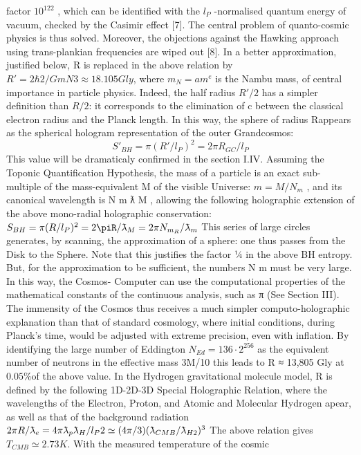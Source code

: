 factor $10^{122}$ , which can be identified with the $l_{P}$ -normalised quantum energy of vacuum, checked by
the Casimir effect [7]. The central problem of quanto-cosmic physics is thus solved. Moreover, the
objections against the Hawking approach using trans-plankian frequencies are wiped out [8].
In a better approximation, justified below, R is replaced in the above relation by $R\prime = 2\hbar 2/Gm N3
≈ 18.105 Gly$, where $m_{N} = am^{e}$ is the Nambu mass, of central importance in particle
physics. Indeed, the half radius $R\prime/2$ has a simpler definition than $R/2$: it corresponds to the
elimination of c between the classical electron radius and the Planck length. In this way, the sphere
of radius R\prime appears as the spherical hologram representation of the outer Grandcosmos:
$$S\prime_{BH} = \pi(R\prime/l_{P} )^{2} = 2\pi R_{GC} /l_{P}$$
This value will be dramaticaly confirmed in the section I.IV.
Assuming the Toponic Quantification Hypothesis, the mass of a particle is an exact sub-multiple
of the mass-equivalent M of the visible Universe: $m = M/N_{m}$ , and its canonical wavelength is N m ƛ M ,
allowing the following holographic extension of the above mono-radial holographic conservation:
$S_{BH} = \pi(R/l_{P})^{2} = 2\piR/\lambdabar_{M} = 2\pi N_{m_{R}}/\lambdabar_{m}$
This series of large circles generates, by scanning, the approximation of a sphere: one thus passes
from the Disk to the Sphere. Note that this justifies the factor 1⁄4 in the above BH entropy. But, for
the approximation to be sufficient, the numbers N m must be very large. In this way, the Cosmos-
Computer can use the computational properties of the mathematical constants of the continuous
analysis, such as π (See Section III).
The immensity of the Cosmos thus receives a much simpler computo-holographic explanation than
that of standard cosmology, where initial conditions, during Planck's time, would be adjusted with
extreme precision, even with inflation. By identifying the large number of Eddington $N_{Ed} = 136 \cdot
2^{256}$ as the equivalent number of neutrons in the effective mass 3M/10 this leads to R ≈ 13,805
Gly at $0.05\%$of the above value.
In the Hydrogen gravitational molecule model, R is defined by the following 1D-2D-3D Special
Holographic Relation, where the wavelengths of the Electron, Proton, and Atomic and Molecular
Hydrogen apear, as well as that of the background radiation
$2 \pi R/\lambdabar_{e} = 4 \pi \lambdabar_{p} \lambdabar_{H} /l_{P} 2 \simeq (4\pi/3)(\lambdabar_{CMB} /\lambdabar_{H2})^{3}$
The above relation gives $T_{CMB} \simeq 2.73 K$. With the measured temperature of the cosmic
